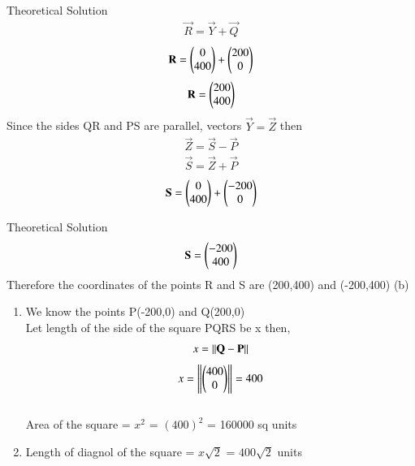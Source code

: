 \documentclass{beamer}
\begin{document}
    \begin{frame}{Theoretical Solution}
        \begin{align}
                \vec{R}=\vec{Y}+\vec{Q}
            \end{align}
            \begin{align}
                \mathbf{R}=\begin{pmatrix}0\\400\end{pmatrix}+\begin{pmatrix}200\\0\end{pmatrix}
            \end{align}
            \begin{align}
                \mathbf{R}=\begin{pmatrix}200\\400\end{pmatrix}
            \end{align}
            Since the sides QR and PS are parallel, vectors $\vec{Y}=\vec{Z}$ then
            \begin{align}
                \vec{Z}=\vec{S}-\vec{P}
            \end{align}
            \begin{align}
                \vec{S}=\vec{Z}+\vec{P}
            \end{align}
            \begin{align}
                \mathbf{S}=\begin{pmatrix}0\\400\end{pmatrix}+\begin{pmatrix}-200\\0\end{pmatrix}
            \end{align}
    \end{frame}
    \begin{frame}{Theoretical Solution}
        \begin{align}
                \mathbf{S}=\begin{pmatrix}-200\\400\end{pmatrix}
            \end{align}
            Therefore the coordinates of the points R and S are (200,400) and (-200,400)
            (b)
            \begin{enumerate}[label=(\roman*)]
                \item We know the points P(-200,0) and Q(200,0)\\
                   Let length of the side of the square PQRS be x then,
                   \begin{align}
                       x=\left\lVert\mathbf{Q}-\mathbf{P}\right\rVert
                   \end{align}
                   \begin{align}
                       x=\left\lVert\begin{pmatrix}400\\0\end{pmatrix}\right\rVert=400
                   \end{align}\\
                
                Area of the square = $x^2$ = $(400)^2$ = 160000 sq units\\
                \item Length of diagnol of the square = $x\sqrt{2}$ = $400\sqrt{2}$ units\\
            \end{enumerate}
    \end{frame}
\end{document}
